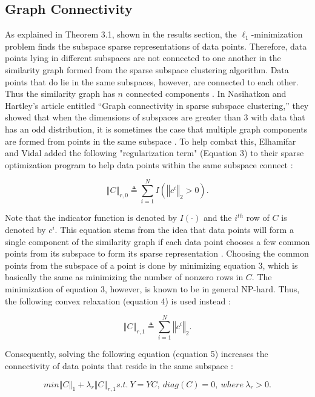 \documentclass{article}
\begin{document}
\subsection{Graph Connectivity}

\hspace{\parindent}As explained in Theorem 3.1, shown in the results section, the $\ell_1$-minimization problem finds the subspace sparse representations of data points. Therefore, data points lying in different subspaces are not connected to one another in the similarity graph formed from the sparse subspace clustering algorithm. Data points that do lie in the same subspaces, however, are connected to each other. Thus the similarity graph has $n$ connected components \cite{elhamifar2012sparse}. In Nasihatkon and Hartley's article entitled “Graph connectivity in sparse subspace clustering,'' they showed that when the dimensions of subspaces are greater than 3 with data that has an odd distribution, it is sometimes the case that multiple graph components are formed from points in the same subspace \cite{elhamifar2012sparse}. To help combat this, Elhamifar and Vidal added the following "regularization term" (Equation 3) to their sparse optimization program to help data points within the same subspace connect \cite{elhamifar2012sparse}:

\[ \left\Vert C \right\Vert_{r,0} \triangleq \sum\limits_{i=1}^N I(\left\Vert c^i \right\Vert_2 > 0).  
\]

Note that the indicator function is denoted by $I(\cdot)$ and the $i^{th}$ row of $C$ is denoted by $c^i$. This equation stems from the idea that data points will form a single component of the similarity graph if each data point chooses a few common points from its subspace to form its sparse representation \cite{elhamifar2012sparse}. Choosing the common points from the subspace of a point is done by minimizing equation 3, which is basically the same as minimizing the number of nonzero rows in $C$. The minimization of equation 3, however, is known to be in general NP-hard. Thus, the following convex relaxation (equation 4) is used instead \cite{elhamifar2012sparse}:

\[ \left\Vert C \right\Vert_{r,1} \triangleq \sum\limits_{i=1}^N \left\Vert c^i \right\Vert_2.  
\]

Consequently, solving the following equation (equation 5) increases the connectivity of data points that reside in the same subspace \cite{elhamifar2012sparse}:


\[ min \left\Vert C \right\Vert_1 + \lambda_r \left\Vert C \right\Vert_{r,1} s.t. \ Y = YC, \  diag(C) = 0, \ where \ \lambda_r > 0.
\]
\end{document}
